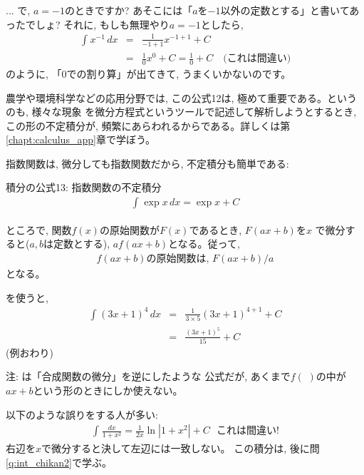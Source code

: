 \begin{faq}{\small{}
 ... で, $a=-1$のときですか? 
あそこには「$a$を$-1$以外の定数とする」と書いてあったでしょ? それに, 
もしも無理やり$a=-1$としたら, 
\begin{eqnarray*}
\int_{}^{} x^{-1} \,dx&=&\frac{1}{-1+1}x^{-1+1}+C\\
&=&\frac{1}{0}x^{0}+C=\frac{1}{0}+C\quad\text{(これは間違い)}
\end{eqnarray*}
のように, 「0での割り算」が出てきて, うまくいかないのです。
}\end{faq}

農学や環境科学などの応用分野では, この公式12は, 極めて重要である。というのも, 様々な現象
を微分方程式というツールで記述して解析しようとするとき, この形の不定積分が, 
頻繁にあらわれるからである。詳しくは第\ref{chapt:calculus_app}章で学ぼう。\hv

指数関数は, 微分しても指数関数だから, 不定積分も簡単である:

\begin{itembox}{積分の公式13: 指数関数の不定積分}
\begin{eqnarray}
\int_{}^{} \exp x \,dx=\exp x+C
\end{eqnarray}
\end{itembox}

ところで, 関数$f(x)$の原始関数が$F(x)$であるとき, $F(ax+b)$を$x$
で微分すると($a, b$は定数とする), $af(ax+b)$となる。従って, 
\begin{eqnarray}f(ax+b)\text{の原始関数は,}\,\, F(ax+b)/a\label{eq:int_gousei_ax_b}\end{eqnarray}
となる。
\begin{exmpl} を使うと, 
\begin{eqnarray}
\int_{}^{} (3x+1)^4\, dx&=&\frac{1}{3\times5}(3x+1)^{4+1}+C\\
                        &=&\frac{(3x+1)^5}{15}+C
\end{eqnarray}
(例おわり)\end{exmpl}

注: は「合成関数の微分」を逆にしたような
公式だが, あくまで$f(\,\,)$の中が$ax+b$という形のときにしか使えない。

\begin{freqmiss}{\small 以下のような誤りをする人が多い:
\begin{eqnarray*}
\int_{}^{} \frac{dx}{1+x^2}=\frac{1}{2x}\ln|1+x^2|+C\,\,\,\,\text{これは間違い!}
\end{eqnarray*}
右辺を$x$で微分すると決して左辺には一致しない。
この積分は, 後に問\ref{q:int_chikan2}で学ぶ。}\end{freqmiss}

